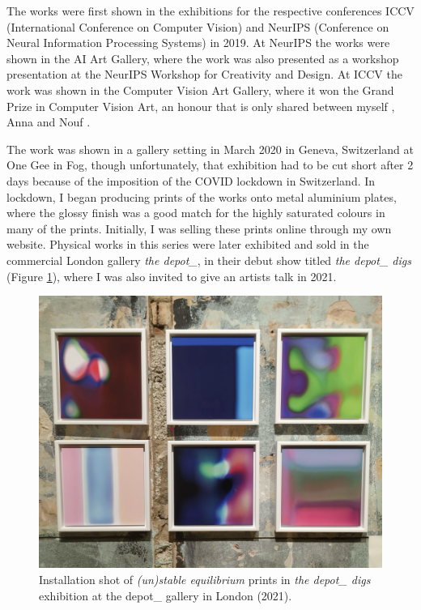 The works were first shown in the exhibitions for the respective conferences ICCV (International Conference on Computer Vision) and NeurIPS (Conference on Neural Information Processing Systems) in 2019. 
At NeurIPS the works were shown in the AI Art Gallery, where the work was also presented as a workshop presentation at the NeurIPS Workshop for Creativity and Design. 
At ICCV the work was  shown in the Computer Vision Art Gallery, where it won the Grand Prize in Computer Vision Art, an honour that is only shared between myself \citep{broad2019unstable}, Anna \citet{ridler2018mosaic} and Nouf \citet{aljowaysir2021salaf}.

The work was shown in a gallery setting in March 2020 in Geneva, Switzerland at One Gee in Fog, though unfortunately, that exhibition had to be cut short after 2 days because of the imposition of the COVID lockdown in Switzerland. 
In lockdown, I began producing prints of the works onto metal aluminium plates, where the glossy finish was a good match for the highly saturated colours in many of the prints. 
Initially, I was selling these prints online through my own website. Physical works in this series were later exhibited and sold in the commercial London gallery \textit{the depot\_}, in their debut show titled \textit{the depot\_ digs} \citep{depot2021digs} (Figure \ref{fig:c7:depot_digs}), where I was also invited to give an artists talk in 2021.

\begin{figure}[!htb]
    \centering
    \captionsetup{justification=centering}
    \includegraphics[width=1\textwidth]{figures/c7_impact/depot_cropped.png}
    \caption[Installation shot of \textit{(un)stable equilibrium} in the depot\_ gallery]{Installation shot of \textit{(un)stable equilibrium} prints in \textit{the depot\_ digs} exhibition at the depot\_ gallery in London (2021).}
    \label{fig:c7:depot_digs}
\end{figure}

